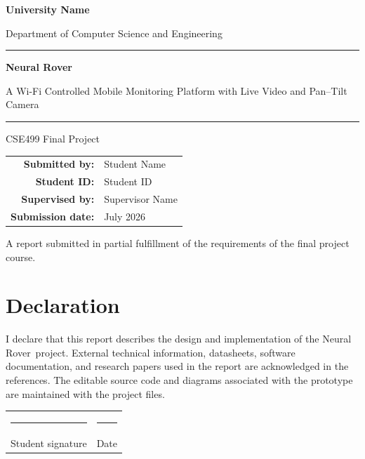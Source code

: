 \documentclass[12pt,a4paper,oneside]{report}
\newcommand{\ProjectTitle}{Neural Rover}
\newcommand{\ProjectSubtitle}{A Wi-Fi Controlled Mobile Monitoring Platform with Live Video and Pan--Tilt Camera}
\newcommand{\StudentName}{Student Name}
\newcommand{\StudentID}{Student ID}
\newcommand{\SupervisorName}{Supervisor Name}
\newcommand{\DepartmentName}{Department of Computer Science and Engineering}
\newcommand{\UniversityName}{University Name}
\newcommand{\CourseCode}{CSE499 Final Project}
\newcommand{\SubmissionDate}{July 2026}
\begin{document}
\begin{titlepage}
  \centering
  \vspace*{1.2cm}
  {\Large\bfseries \UniversityName\par}
  \vspace{0.4cm}
  {\large \DepartmentName\par}
  \vspace{1.7cm}
  {\color{RoverBlue}\rule{\textwidth}{2pt}\par}
  \vspace{0.8cm}
  {\Huge\bfseries\color{RoverNavy}\ProjectTitle\par}
  \vspace{0.45cm}
  {\LARGE\ProjectSubtitle\par}
  \vspace{0.8cm}
  {\color{RoverBlue}\rule{\textwidth}{2pt}\par}
  \vspace{1.5cm}
  {\Large\CourseCode\par}
  \vfill
  \begin{tabular}{rl}
    \textbf{Submitted by:} & \StudentName \\
    \textbf{Student ID:} & \StudentID \\
    \textbf{Supervised by:} & \SupervisorName \\
    \textbf{Submission date:} & \SubmissionDate
  \end{tabular}
  \vfill
  {\large A report submitted in partial fulfillment of the requirements of the final project course.\par}
\end{titlepage}


\chapter*{Declaration}
I declare that this report describes the design and implementation of the
\ProjectTitle\ project. External technical information, datasheets, software
documentation, and research papers used in the report are acknowledged in the
references. The editable source code and diagrams associated with the prototype
are maintained with the project files.

\vspace{2cm}
\noindent
\begin{tabularx}{\textwidth}{X X}
  \rule{6cm}{0.4pt} & \rule{6cm}{0.4pt} \\
  Student signature & Date
\end{tabularx}
\end{document}
